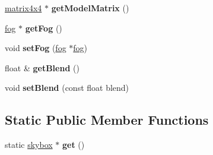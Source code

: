\begin{DoxyCompactItemize}
\mbox{\label{classflounder_1_1skybox_aa60fd072acdc4fd7749625aa51d0ee63}} 
\hyperlink{classflounder_1_1matrix4x4}{matrix4x4} $\ast$ {\bfseries get\+Model\+Matrix} ()
\item 
\mbox{\label{classflounder_1_1skybox_a9f964aed2c989f0b864bd7e2533cb9f0}} 
\hyperlink{classflounder_1_1fog}{fog} $\ast$ {\bfseries get\+Fog} ()
\item 
\mbox{\label{classflounder_1_1skybox_abf5b6032f01a6005ddef2b2d8d9bddec}} 
void {\bfseries set\+Fog} (\hyperlink{classflounder_1_1fog}{fog} $\ast$\hyperlink{classflounder_1_1fog}{fog})
\item 
\mbox{\label{classflounder_1_1skybox_a48702fe266209968e89659a5e95c6a0c}} 
float \& {\bfseries get\+Blend} ()
\item 
\mbox{\label{classflounder_1_1skybox_a8699bb525b6a2c1e300fc59d0038f70e}} 
void {\bfseries set\+Blend} (const float blend)
\end{DoxyCompactItemize}
\subsection*{Static Public Member Functions}
\begin{DoxyCompactItemize}
\item 
\mbox{\label{classflounder_1_1skybox_a4d6b3b6d783e4ad3d3f060cbd0e04e7c}} 
static \hyperlink{classflounder_1_1skybox}{skybox} $\ast$ {\bfseries get} ()
\end{DoxyCompactItemize}
